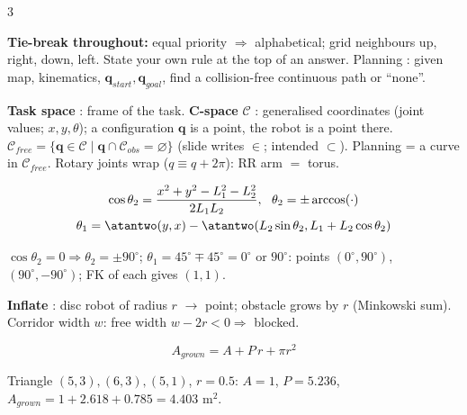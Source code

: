 \begin{multicols}{3}

\textbf{Tie-break throughout:} equal priority $\Rightarrow$ alphabetical; grid neighbours up, right, down, left. State your own rule at the top of an answer. Planning : given map, kinematics, $\mathbf q_{start},\mathbf q_{goal}$, find a collision-free continuous path or ``none''.

\textbf{Task space} : frame of the task. \textbf{C-space} $\mathcal C$ : generalised coordinates (joint values; $x,y,\theta$); a configuration $\mathbf q$ is a point, the robot is a point there. $\mathcal C_{free}=\{\mathbf q\in\mathcal C\mid\mathbf q\cap\mathcal C_{obs}=\varnothing\}$  (slide writes $\in$; intended $\subset$). Planning = a curve in $\mathcal C_{free}$. Rotary joints wrap ($q\equiv q+2\pi$): RR arm $=$ torus.
\begin{fbx}
\begin{gather*}\cos\theta_2=\frac{x^2+y^2-L_1^2-L_2^2}{2L_1L_2},\ \ \theta_2=\pm\arccos(\cdot)\\ \theta_1=\atantwo(y,x)-\atantwo(L_2\sin\theta_2,L_1+L_2\cos\theta_2)\end{gather*}
\end{fbx}
\begin{worked}[$L_1=L_2=1$, $P=(1,1)$]
$\cos\theta_2=0\Rightarrow\theta_2=\pm90^\circ$; $\theta_1=45^\circ\mp45^\circ=0^\circ$ or $90^\circ$: points $(0^\circ,90^\circ)$, $(90^\circ,-90^\circ)$; FK of each gives $(1,1)$. \chk
\end{worked}
\textbf{Inflate} : disc robot of radius $r$ $\to$ point; obstacle grows by $r$ (Minkowski sum). Corridor width $w$: free width $w-2r<0\Rightarrow$ blocked.
\begin{fbx}
\[A_{grown}=A+P\,r+\pi r^2\]
\end{fbx}
Triangle $(5,3),(6,3),(5,1)$, $r=0.5$: $A=1$, $P=5.236$, $A_{grown}=1+2.618+0.785=4.403$ m$^2$. \chk


\end{multicols}
